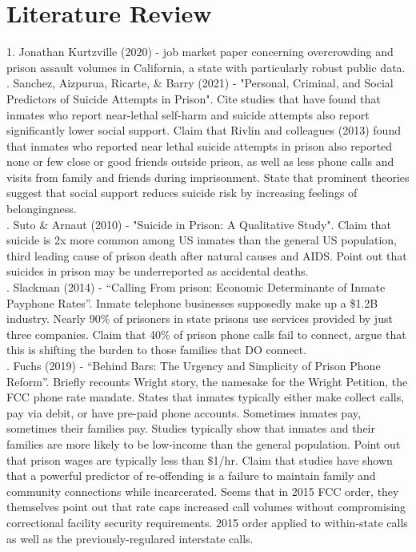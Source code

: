 \documentclass[10pt,a4paper]{article}
\begin{document}
\section{Literature Review}
1. Jonathan Kurtzville (2020) - job market paper concerning overcrowding and prison assault volumes in California, a state with particularly robust public data. \\

. Sanchez, Aizpurua, Ricarte, \& Barry (2021) - "Personal, Criminal, and Social Predictors of Suicide Attempts in Prison". Cite studies that have found that inmates who report near-lethal self-harm and suicide attempts also report significantly lower social support. Claim that Rivlin and colleagues (2013) found that inmates who reported near lethal suicide attempts in prison also reported none or few close or good friends outside prison, as well as less phone calls and visits from family and friends during imprisonment. State that prominent theories suggest that social support reduces suicide risk by increasing feelings of belongingness. \\

. Suto \& Arnaut (2010) - "Suicide in Prison: A Qualitative Study". Claim that suicide is 2x more common among US inmates than the general US population, third leading cause of prison death after natural causes and AIDS. Point out that suicides in prison may be underreported as accidental deaths. \\

. Slackman (2014) - “Calling From prison: Economic Determinante of Inmate Payphone Rates”. Inmate telephone businesses supposedly make up a \$1.2B industry. Nearly 90\% of prisoners in state prisons use services provided by just three companies. Claim that 40\% of prison phone calls fail to connect, argue that this is shifting the burden to those families that DO connect. \\

. Fuchs (2019) - “Behind Bars: The Urgency and Simplicity of Prison Phone Reform”. Briefly recounts Wright story, the namesake for the Wright Petition, the FCC phone rate mandate. States that inmates typically either make collect calls, pay via debit, or have pre-paid phone accounts. Sometimes inmates pay, sometimes their families pay. Studies typically show that inmates and their families are more likely to be low-income than the general population. Point out that prison wages are typically less than \$1/hr. Claim that studies have shown that a powerful predictor of re-offending is a failure to maintain family and community connections while incarcerated. Seems that in 2015 FCC order, they themselves point out that rate caps increased call volumes without compromising correctional facility security requirements. 2015 order applied to within-state calls as well as the previously-regulared interstate calls. \\
\end{document}
